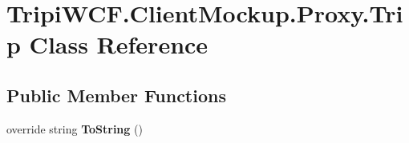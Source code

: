 \hypertarget{class_tripi_w_c_f_1_1_client_mockup_1_1_proxy_1_1_trip}{
\section{TripiWCF.ClientMockup.Proxy.Trip Class Reference}
\label{class_tripi_w_c_f_1_1_client_mockup_1_1_proxy_1_1_trip}
}
\subsection*{Public Member Functions}
\begin{DoxyCompactItemize}
\item 
\hypertarget{class_tripi_w_c_f_1_1_client_mockup_1_1_proxy_1_1_trip_a064a43fef1dbb2547aaa5ca8a47c1f5d}{
override string {\bfseries ToString} ()}
\label{class_tripi_w_c_f_1_1_client_mockup_1_1_proxy_1_1_trip_a064a43fef1dbb2547aaa5ca8a47c1f5d}

\end{DoxyCompactItemize}
